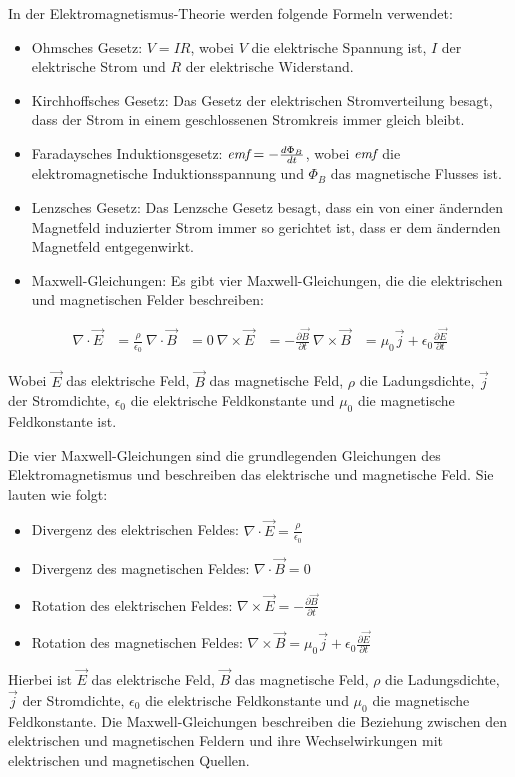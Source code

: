 \documentclass{report}
\begin{document}
In der Elektromagnetismus-Theorie werden folgende Formeln verwendet:
\begin{itemize}
  \item Ohmsches Gesetz: $V = IR$, wobei $V$ die elektrische Spannung ist, $I$ der elektrische Strom und $R$ der elektrische Widerstand.
  \item Kirchhoffsches Gesetz: Das Gesetz der elektrischen Stromverteilung besagt, dass der Strom in einem geschlossenen Stromkreis immer gleich bleibt. 
  \item Faradaysches Induktionsgesetz: $\emph{emf} = -\frac{d\Phi_B}{dt}$, wobei $\emph{emf}$ die elektromagnetische Induktionsspannung und $\Phi_B$ das magnetische Flusses ist. 
  \item Lenzsches Gesetz: Das Lenzsche Gesetz besagt, dass ein von einer ändernden Magnetfeld induzierter Strom immer so gerichtet ist, dass er dem ändernden Magnetfeld entgegenwirkt. 
  \item Maxwell-Gleichungen: Es gibt vier Maxwell-Gleichungen, die die elektrischen und magnetischen Felder beschreiben:
\end{itemize}

\begin{align} \nabla \cdot \vec{E} &= \frac{\rho}{\epsilon_0} \ \nabla \cdot
  \vec{B} &= 0 \ \nabla \times \vec{E} &= -\frac{\partial \vec{B}}{\partial t}
  \ \nabla \times \vec{B} &= \mu_0 \vec{j} + \epsilon_0 \frac{\partial
  \vec{E}}{\partial t}
\end{align}

  Wobei $\vec{E}$ das elektrische Feld, $\vec{B}$ das magnetische Feld, $\rho$
  die Ladungsdichte, $\vec{j}$ der Stromdichte, $\epsilon_0$ die elektrische
  Feldkonstante und $\mu_0$ die magnetische Feldkonstante ist.

  Die vier Maxwell-Gleichungen sind die grundlegenden Gleichungen des
  Elektromagnetismus und beschreiben das elektrische und magnetische Feld. Sie
  lauten wie folgt: 
\begin{itemize} 
\item Divergenz des elektrischen Feldes: $\nabla \cdot \vec{E} = \frac{\rho}{\epsilon_0}$ 
\item Divergenz des magnetischen Feldes: $\nabla \cdot \vec{B} = 0$ 
\item Rotation des elektrischen Feldes: $\nabla \times \vec{E} = -\frac{\partial \vec{B}}{\partial t}$ 
\item Rotation des magnetischen Feldes: $\nabla \times \vec{B} = \mu_0 \vec{j} + \epsilon_0 \frac{\partial \vec{E}}{\partial t}$ 
\end{itemize}
Hierbei ist $\vec{E}$ das elektrische Feld, $\vec{B}$ das magnetische Feld,
$\rho$ die Ladungsdichte, $\vec{j}$ der Stromdichte, $\epsilon_0$ die
elektrische Feldkonstante und $\mu_0$ die magnetische Feldkonstante. Die
Maxwell-Gleichungen beschreiben die Beziehung zwischen den elektrischen und
magnetischen Feldern und ihre Wechselwirkungen mit elektrischen und
magnetischen Quellen.
\end{document}
